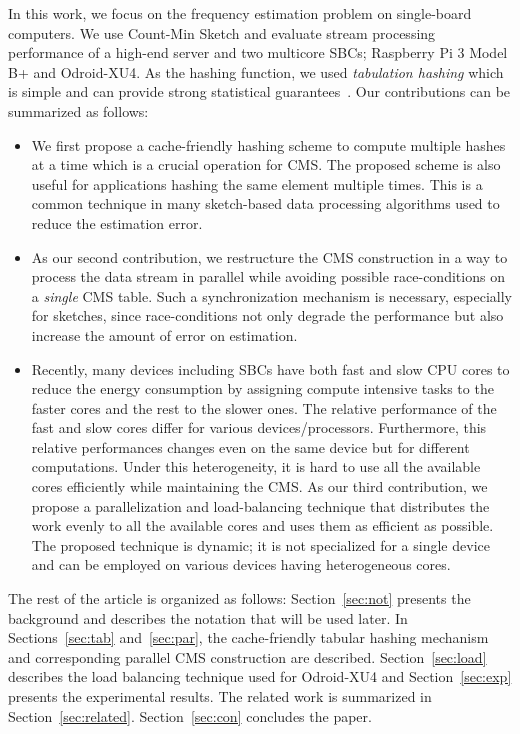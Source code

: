 \documentclass[10pt, review=true,sigconf]{acmart}
\begin{document}
In this work, we focus on the frequency estimation problem on single-board computers. We use Count-Min Sketch and evaluate stream processing performance of a high-end server and two multicore SBCs; Raspberry Pi 3 Model B+ and Odroid-XU4. As the hashing function, we used {\em tabulation hashing} which is simple and can provide strong statistical guarantees~\cite{patrascu2012,thorup2017}. Our contributions can be summarized as follows:
\vspace{-0.9\topsep}
\begin{itemize}[leftmargin=*]
\item We first propose a cache-friendly hashing scheme to compute multiple hashes at a time which is a crucial operation for CMS. The proposed scheme is  also useful for applications hashing the same element multiple times. This is a common technique in many sketch-based data processing algorithms used to reduce the estimation error. 
\item As our second contribution, we restructure the CMS construction in a way to process the data stream in parallel while avoiding possible race-conditions on a {\em single} CMS table. Such a synchronization mechanism is necessary, especially for sketches, since race-conditions not only degrade the performance but also increase the amount of error on estimation. 
\item Recently, many devices including SBCs have both fast and slow CPU cores to reduce the energy consumption by assigning compute intensive tasks to the faster cores and the rest to the slower ones. The relative performance of the fast and slow cores differ for various devices/processors. Furthermore, this relative performances changes even on the same device but for different computations. Under this heterogeneity, it is hard to use all the available cores efficiently while maintaining the CMS. As our third contribution, we propose a parallelization and load-balancing technique that distributes the work evenly to all the available cores and uses them as efficient as possible. The proposed technique is dynamic; it is not specialized for a single device and can be employed on various devices having heterogeneous cores. 
\end{itemize}
\vspace{-0.9\topsep}

The  rest of the article is organized as follows: Section~\ref{sec:not} presents the background and describes the notation that will be used later. In Sections~\ref{sec:tab} and~\ref{sec:par}, the cache-friendly tabular hashing mechanism and corresponding parallel CMS construction are described. Section~\ref{sec:load} describes the load balancing technique used for Odroid-XU4 and Section~\ref{sec:exp} presents the experimental results. The related work is summarized in Section~\ref{sec:related}. Section~\ref{sec:con} concludes the paper.
   
\end{document}
